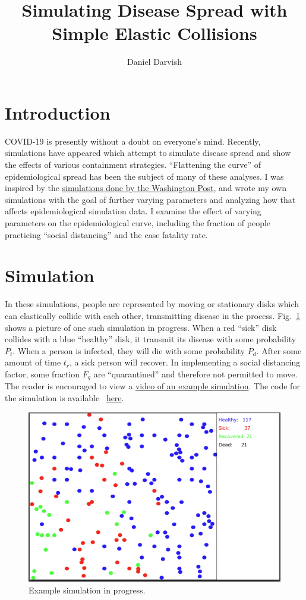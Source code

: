 \documentclass[11pt]{article}
\title{Simulating Disease Spread with Simple Elastic Collisions}
\author{Daniel Darvish}
\date{}
\begin{document}
\maketitle
\section{Introduction}
COVID-19 is presently without a doubt on everyone's mind. Recently, simulations have appeared which attempt to simulate disease spread and show the effects of various containment strategies. ``Flattening the curve'' of epidemiological spread has been the subject of many of these analyses. I was inspired by the \href{https://www.washingtonpost.com/graphics/2020/world/corona-simulator/}{simulations done by the Washington Post}, and wrote my own simulations with the goal of further varying parameters and analyzing how that affects epidemiological simulation data. I examine the effect of varying parameters on the epidemiological curve, including the fraction of people practicing ``social distancing'' and the case fatality rate.
\section{Simulation}
In these simulations, people are represented by moving or stationary disks which can elastically collide with each other, transmitting disease in the process. Fig.~\ref{fig:sim_ex_1} shows a picture of one such simulation in progress. When a red ``sick'' disk collides with a blue ``healthy'' disk, it transmit its disease with some probability $P_{t}$. When a person is infected, they will die with some probability $P_d$. After some amount of time $t_r$, a sick person will recover. In implementing a social distancing factor, some fraction $F_{q}$ are ``quarantined'' and therefore not permitted to move. The reader is encouraged to view a \href{https://www.youtube.com/watch?v=YYKz1-txdYw}{video of an example simulation}. The code for the simulation is available ~\href{https://github.com/dannydarvish/battelle_covid}{here}.

\begin{figure}[h]

    \centering
    \includegraphics[scale=0.15]{figs/sim_ex_1.png}
    \caption{Example simulation in progress.}\label{fig:sim_ex_1}
\end{figure}
\end{document}
